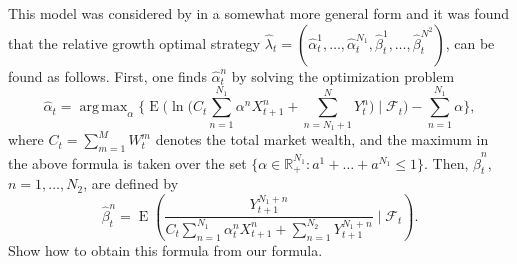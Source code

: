 \documentclass[a4paper,11pt,english]{article}
\theoremstyle{definition}
\DeclareMathOperator{\E}{E}
\DeclareMathOperator{\argmax}{arg\,max}
\renewcommand{\hat}{\widehat}
\newcommand{\F}{\mathcal{F}}
\newcommand{\R}{\mathbb{R}}
\newcommand{\red}[1]{{\color{red}#1}}
\begin{document}
This model was considered by \cite{Zhitlukhin22} in a somewhat more general form
and it was found that the relative growth optimal strategy $\hat\lambda_t = (\hat\alpha_t^1,\dots,\hat\alpha_t^{N_1}, \hat\beta_t^1, \dots, \hat\beta_t^{N^2})$, can be found as follows. First, one finds $\hat\alpha_t^n$ by solving the optimization problem
\[
\hat\alpha_t = \argmax_{\alpha}\Biggl\{ \E\biggl( \ln\biggl( C_t \sum_{n=1}^{N_1} \alpha^n X_{t+1}^n + \sum_{n=N_1+1}^N Y_t^n\biggr) \mid \F_t \biggr) - \sum_{n=1}^{N_1} \alpha\Biggr\},
\]
where $C_t = \sum_{m=1}^M W_t^m$ denotes the total market wealth, and the maximum in the above formula is taken over the set $\{\alpha \in \R_+^{N_1} : a^1+\dots+a^{N_1} \le 1\}$. 
Then, $\hat\beta_t^n$, $n=1,\dots,N_2$, are defined by
\[
\hat \beta_t^n = \E \left( \frac{Y_{t+1}^{N_1+n}}{C_t\sum_{n=1}^{N_1} \alpha_t^n X_{t+1}^n  + \sum_{n=1}^{N_2} Y_{t+1}^{N_1+n}} \mid \F_t \right). 
\]
\red{Show how to obtain this formula from our formula.}


\small 
\setlength{\bibsep}{0.2em plus 0.3em}


\end{document}
